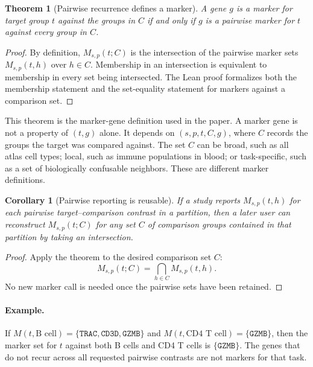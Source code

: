 \documentclass{article}
\newtheorem{theorem}{Theorem}
\newtheorem{corollary}{Corollary}
\begin{document}
\begin{theorem}[Pairwise recurrence defines a marker]\label{thm:pairwise-recurrence-marker}
A gene $g$ is a marker for target group $t$ against the groups in $C$ if and only if $g$ is a pairwise marker for $t$ against every group in $C$.
\end{theorem}

\begin{proof}
By definition, $M_{s,p}(t;C)$ is the intersection of the pairwise marker sets $M_{s,p}(t,h)$ over $h\in C$. Membership in an intersection is equivalent to membership in every set being intersected. The Lean proof formalizes both the membership statement and the set-equality statement for markers against a comparison set.
\end{proof}

This theorem is the marker-gene definition used in the paper. A marker gene is not a property of $(t,g)$ alone. It depends on $(s,p,t,C,g)$, where $C$ records the groups the target was compared against. The set $C$ can be broad, such as all atlas cell types; local, such as immune populations in blood; or task-specific, such as a set of biologically confusable neighbors. These are different marker definitions.

\begin{corollary}[Pairwise reporting is reusable]\label{cor:pairwise-reporting-reusable}
If a study reports $M_{s,p}(t,h)$ for each pairwise target--comparison contrast in a partition, then a later user can reconstruct $M_{s,p}(t;C)$ for any set $C$ of comparison groups contained in that partition by taking an intersection.
\end{corollary}

\begin{proof}
Apply the theorem to the desired comparison set $C$:
\[
  M_{s,p}(t;C)=\bigcap_{h\in C}M_{s,p}(t,h).
\]
No new marker call is needed once the pairwise sets have been retained.
\end{proof}

\paragraph{Example.}
If $M(t,\text{B cell})=\{\texttt{TRAC},\texttt{CD3D},\texttt{GZMB}\}$ and $M(t,\text{CD4 T cell})=\{\texttt{GZMB}\}$, then the marker set for $t$ against both B cells and CD4 T cells is $\{\texttt{GZMB}\}$. The genes that do not recur across all requested pairwise contrasts are not markers for that task.
\end{document}
